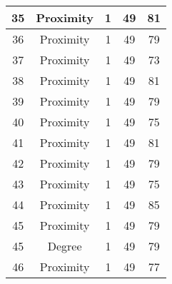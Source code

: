 \documentclass[results.tex]{subfiles}
\begin{document}
\begin{center}
\begin{tabular}{| c || c | c | c | c |}
            \hline
            35                      & Proximity                    & 1                      & 49                      & 81                   \\
            \hline
            36                      & Proximity                    & 1                      & 49                      & 79                   \\
            \hline
            37                      & Proximity                    & 1                      & 49                      & 73                   \\
            \hline
            38                      & Proximity                    & 1                      & 49                      & 81                   \\
            \hline
            39                      & Proximity                    & 1                      & 49                      & 79                   \\
            \hline
            40                      & Proximity                    & 1                      & 49                      & 75                   \\
            \hline
            41                      & Proximity                    & 1                      & 49                      & 81                   \\
            \hline
            42                      & Proximity                    & 1                      & 49                      & 79                   \\
            \hline
            43                      & Proximity                    & 1                      & 49                      & 75                   \\
            \hline
            44                      & Proximity                    & 1                      & 49                      & 85                   \\
            \hline
            45                      & Proximity                    & 1                      & 49                      & 79                   \\
            \hline
            45                      & Degree                       & 1                      & 49                      & 79                   \\
            \hline
            46                      & Proximity                    & 1                      & 49                      & 77                   \\

\end{tabular}
\end{center}
\end{document}
